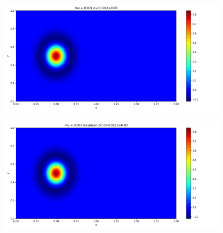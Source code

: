 \documentclass[12pt]{article}
\begin{document}
\begin{figure}[H]
\centering
\begin{minipage}{\linewidth}
\centering
\begin{minipage}{0.5\textwidth}
\includegraphics[width=\linewidth]{figuresmu/mu3d0.010t0.00.png}
\label{fig1}
\end{minipage}\hfill
\begin{minipage}{0.5\textwidth}
\includegraphics[width=\linewidth]{figuresmu/mu3Nud0.010t0.00.png}
\label{fig2}
\end{minipage}
\vspace{-1.5em}


\end{minipage}
\end{figure}
\end{document}
